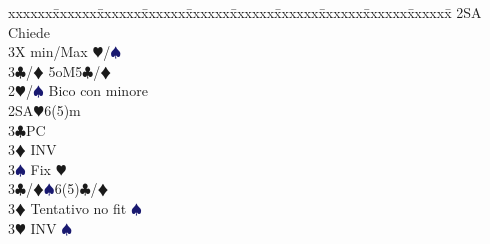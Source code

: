 \documentclass[a4paper,italian]{article}
\newcommand{\BC}{\textcolor{OliveGreen}{$\clubsuit$}}
\newcommand{\BD}{\textcolor{RedOrange}{$\vardiamondsuit$}}
\newcommand{\BH}{\textcolor{Red2}{$\varheartsuit${}}}
\newcommand{\BS}{\textcolor{MidnightBlue}{$\spadesuit${}}}
\newenvironment{bidtable}
{\begin{tabbing}

    xxxxxx\=xxxxxx\=xxxxxx\=xxxxxx\=xxxxxx\=xxxxxx\=xxxxxx\=xxxxxx\=xxxxxx\=xxxxxx\=\kill}
{\end{tabbing} }%
\begin{document}
\begin{multicols}{2}
\begin{bidtable}
                                                2SA\> Chiede\+\\
                                                    3X\> min/Max \BH/\BS\-\\
                                                3\BC/\BD\> 5oM5\BC/\BD\-\\
                                            2\BH/\BS\> Bico con minore\\
                                            2SA\BH6(5)m\+\\
                                            3\BC\>PC\\
                                            3\BD\> INV\\
                                            3\BS\> Fix \BH\-\\
                                            3\BC/\BD{}\BS6(5)\BC/\BD\+\\
                                            3\BD\> Tentativo no fit \BS\\
                                            3\BH\> INV \BS\\
                                        \end{bidtable}


\end{multicols}
\end{document}
